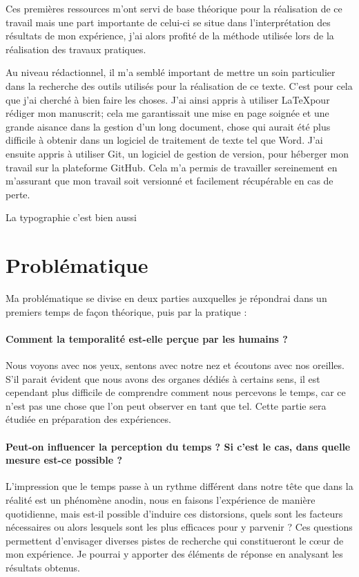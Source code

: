 \documentclass[12pt,fleqn,oneside,openany]{book} %
\begin{document}
Ces premières ressources m'ont servi de base théorique pour la réalisation de ce travail mais une part importante de celui-ci se situe dans l'interprétation des résultats de mon expérience, j'ai alors profité de la méthode utilisée lors de la réalisation des travaux pratiques. 

Au niveau rédactionnel, il m'a semblé important de mettre un soin particulier dans la recherche des outils utilisés pour la réalisation de ce texte. C'est pour cela que j'ai cherché à bien faire les choses. J'ai ainsi appris à utiliser \LaTeX pour rédiger mon manuscrit; cela me garantissait une mise en page soignée et une grande aisance dans la gestion d'un long document, chose qui aurait été plus difficile à obtenir dans un logiciel de traitement de texte tel que Word. J'ai ensuite appris à utiliser Git, un logiciel de gestion de version, pour héberger mon travail sur la plateforme GitHub. Cela m'a permis de travailler sereinement en m'assurant que mon travail soit versionné et facilement récupérable en cas de perte.

La typographie c'est bien aussi \cite{typo}

\section{Problématique} \label{sec:problematique}
Ma problématique se divise en deux parties auxquelles je répondrai dans un premiers temps de façon théorique, puis par la pratique :

\paragraph{Comment la temporalité est-elle perçue par les humains ?} Nous voyons avec nos yeux, sentons avec notre nez et écoutons avec nos oreilles. S'il parait évident que nous avons des organes dédiés à certains sens, il est cependant plus difficile de comprendre comment nous percevons le temps, car ce n'est pas une chose que l'on peut observer en tant que tel. Cette partie sera étudiée en préparation des expériences. 

\paragraph{Peut-on influencer la perception du temps ? Si c'est le cas, dans quelle mesure est-ce possible ?} L'impression que le temps passe à un rythme différent dans notre tête que dans la réalité est un phénomène anodin, nous en faisons l'expérience de manière quotidienne, mais est-il possible d'induire ces distorsions, quels sont les facteurs nécessaires ou alors lesquels sont les plus efficaces pour y parvenir ? Ces questions permettent d'envisager diverses pistes de recherche qui constitueront le cœur de mon expérience. Je pourrai y apporter des éléments de réponse en analysant les résultats obtenus. %
\end{document}
